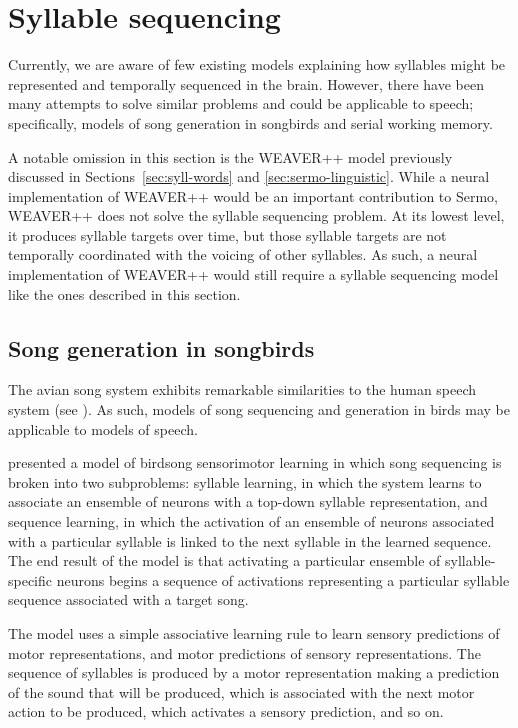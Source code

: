 \section{Syllable sequencing}
\label{sec:prev-sequencing}

Currently,
we are aware of few existing models
explaining how syllables
might be represented
and temporally sequenced in the brain.
However, there have been many attempts
to solve similar problems
and could be applicable to speech;
specifically,
models of song generation in songbirds
and serial working memory.

A notable omission in this section
is the WEAVER++ model
previously discussed in
Sections~\ref{sec:syll-words}
and \ref{sec:sermo-linguistic}.
While a neural implementation of WEAVER++
would be an important contribution to Sermo,
WEAVER++ does not solve
the syllable sequencing problem.
At its lowest level,
it produces syllable targets over time,
but those syllable targets are not temporally
coordinated with the voicing of
other syllables.
As such, a neural implementation
of WEAVER++ would still require
a syllable sequencing model
like the ones described in this section.

\subsection{Song generation in songbirds}

The avian song system
exhibits remarkable similarities
to the human speech system
(see \citealt{bolhuis2010}).
As such, models of song sequencing
and generation in birds
may be applicable to models of speech.

\citet{troyer2000} presented a model
of birdsong sensorimotor learning
in which song sequencing is broken
into two subproblems:
syllable learning,
in which the system learns
to associate an ensemble of neurons
with a top-down syllable representation,
and sequence learning,
in which the activation
of an ensemble of neurons
associated with a particular syllable
is linked to the next syllable
in the learned sequence.
The end result of the model
is that activating a particular
ensemble of syllable-specific neurons
begins a sequence of activations
representing a particular syllable sequence
associated with a target song.

The model uses a
simple associative learning rule
to learn sensory predictions
of motor representations,
and motor predictions
of sensory representations.
The sequence of syllables is produced
by a motor representation
making a prediction of the
sound that will be produced,
which is associated with
the next motor action to be produced,
which activates a sensory prediction,
and so on.

